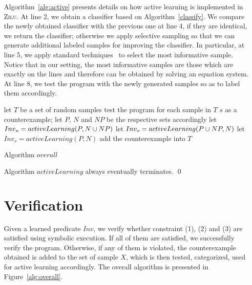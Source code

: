 Algorithm~\ref{alg:active} presents details on how active learning is implemented in \textsc{Zilu}. 
At line 2, we obtain a classifier based on Algorithm~\ref{classify}. 
We compare the newly obtained classifier with the previous one at line 4, if they are identical, we return the classifier; 
otherwise we apply selective sampling so that we can generate additional labeled samples for improving the classifier. 
In particular, at line 5, we apply standard techniques~\cite{DBLP:conf/icml/SchohnC00} to select the most informative sample. 
Notice that in our setting, the most informative samples are those which are exactly on the lines and therefore can be obtained by solving an equation system. 
At line 8, we test the program with the newly generated samples so as to label them accordingly.

\begin{algorithm}[t]
\SetAlgoVlined
\Indm
{}
\Indp
let $T$ be a set of random samples\;
 {
    test the program for each sample in $T$\;
     {
        \Return $s$ as a counterexample;
    }
    let $P$, $N$ and $NP$ be the respective sets accordingly\;
    let $Inv_u = activeLearning(P, N \cup NP)$\;
    let $Inv_o = activeLearning(P \cup NP, N)$\;
    let $Inv_s = activeLearning(P, N)$\;
     {
         {
            add the counterexample into $T$\;
        }
    }
}
\caption{Algorithm $overall$}
\label{alg:overall}
\end{algorithm}

\begin{example}
\end{example}

\begin{proposition}
Algorithm $activeLearning$ always eventually terminates. \hfill \qed
\end{proposition}

\section{Verification}
Given a learned predicate $Inv$, we verify whether constraint (1), (2) and (3) are satisfied using symbolic execution. 
If all of them are satisfied, we successfully verify the program. 
Otherwise, if any of them is violated, the counterexample obtained is added to the set of sample $X$,
 which is then tested, categorized, used for active learning accordingly. 
 The overall algorithm is presented in Figure~\ref{alg:overall}.

